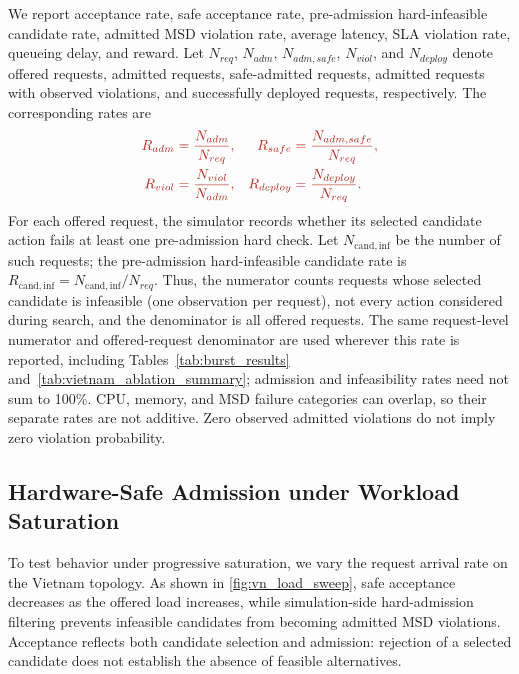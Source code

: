\documentclass[final,5p]{elsarticle}
\newcommand{\rev}[1]{\textcolor{BrickRed}{#1}}
\begin{document}
We report acceptance rate, safe acceptance rate, pre-admission hard-infeasible candidate rate, admitted MSD violation rate, average latency, SLA violation rate, queueing delay, and reward. \rev{Let \(N_{req}\), \(N_{adm}\), \(N_{adm,safe}\), \(N_{viol}\), and \(N_{deploy}\) denote offered requests, admitted requests, safe-admitted requests, admitted requests with observed violations, and successfully deployed requests, respectively. The corresponding rates are}
\begin{equation}
\rev{\begin{aligned}
R_{adm}&=\frac{N_{adm}}{N_{req}},&
R_{safe}&=\frac{N_{adm,safe}}{N_{req}},\\
R_{viol}&=\frac{N_{viol}}{N_{adm}},&
R_{deploy}&=\frac{N_{deploy}}{N_{req}}.
\end{aligned}}
\label{eq:evaluation_rates}
\end{equation}
\rev{For each offered request, the simulator records whether its selected candidate action fails at least one pre-admission hard check. Let \(N_{\mathrm{cand,inf}}\) be the number of such requests; the pre-admission hard-infeasible candidate rate is \(R_{\mathrm{cand,inf}}=N_{\mathrm{cand,inf}}/N_{req}\). Thus, the numerator counts requests whose selected candidate is infeasible (one observation per request), not every action considered during search, and the denominator is all offered requests. The same request-level numerator and offered-request denominator are used wherever this rate is reported, including Tables~\ref{tab:burst_results} and~\ref{tab:vietnam_ablation_summary}; admission and infeasibility rates need not sum to 100\%. CPU, memory, and MSD failure categories can overlap, so their separate rates are not additive. Zero observed admitted violations do not imply zero violation probability.}

\subsection{Hardware-Safe Admission under Workload Saturation}
\label{subsec:hardware_safe_admission}

To test behavior under progressive saturation, we vary the request arrival rate on the Vietnam topology. As shown in \autoref{fig:vn_load_sweep}, safe acceptance decreases as the offered load increases, while simulation-side hard-admission filtering prevents infeasible candidates from becoming admitted MSD violations. \rev{Acceptance reflects both candidate selection and admission: rejection of a selected candidate does not establish the absence of feasible alternatives.}
\end{document}
